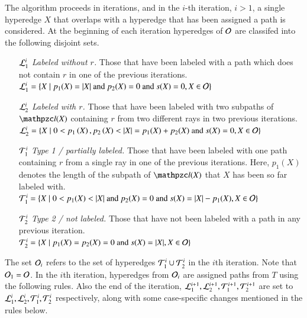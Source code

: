 \documentclass[MS,]{iitmdiss}
\begin{document}
 The algorithm proceeds in iterations, and in the $i$-th
 iteration, $i > 1$, a single hyperedge $X$ that overlaps with a
 hyperedge that has been assigned a path is considered.  At the
 beginning of each iteration hyperedges of ${\cal O}$ are classifed into
 the following disjoint sets.
 \begin{enumerate}
 \item [${\cal L}_1^i$] {\em Labeled without $r$.} Those that have been
   labeled with a path which does not contain $r$ in one of the
   previous iterations.\\  ${\cal L}_1^i = \left\{  X \mid p_1(X) = |X| \text{ and
     } p_2(X) = 0 \text{ and } s(X) = 0, X \in {\cal O}\right\}$
 \item [${\cal L}_2^i$] {\em Labeled with $r$.} Those that have been labeled
   with two subpaths of $\cl(X)$ containing $r$ from two different rays
   in two previous iterations.\\ ${\cal L}_2^i = \left\{ X \mid 0 < p_1\left(X\right),
     p_2\left(X\right) < |X|=p_1(X)+p_2(X) \text{ and } s(X) = 0, X \in {\cal O}\right\}$
   \item [${\cal T}_1^i$] {\em Type 1 / partially labeled.} Those that have
     been labeled with one path containing $r$ from a single ray in one
     of the previous iterations. Here, $p_1(X)$ denotes the length of
     the subpath of $\cl(X)$ that $X$ has been so far labeled
     with. \\
     ${\cal T}_1^i = \left\{  X \mid 0 < p_1(X) < |X| \text{ and } p_2(X) = 0
       \text{ and } s(X) = |X|-p_1(X), X \in {\cal O}\right\}$
   \item [${\cal T}_2^i$] {\em Type 2 / not labeled.} Those that have not been
     labeled with a path in any previous iteration.\\
     ${\cal T}_2^i = \left\{  X \mid p_1(X) = p_2(X) = 0 \text{ and } s(X) = |X|,
       X \in {\cal O}\right\}$
 \end{enumerate}

The set ${\cal O}_i$ refers to the set of hyperedges ${\cal T}_1^i \cup {\cal T}_2^i$
in the $i$th iteration.  Note that ${\cal O}_1 = {\cal O}$.  In the $i$th
iteration, hyperedges from ${\cal O}_i$ are assigned paths from $T$ using
the following rules. Also the end of the iteration, ${\cal L}_1^{i+1},
{\cal L}_2^{i+1}, {\cal T}_1^{i+1}, {\cal T}_2^{i+1}$ are set to ${\cal L}_1^{i},
{\cal L}_2^{i}, {\cal T}_1^{i}, {\cal T}_2^{i}$ respectively, along with some
case-specific changes mentioned in the rules below.
\end{document}
